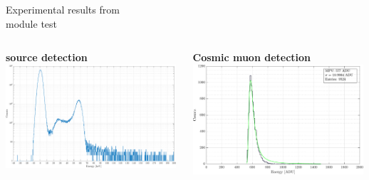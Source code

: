 \documentclass[aspectratio=169,xcolor=dvipsnames]{beamer}
\begin{document}
\begin{frame}{Experimental results from\\ \vskip-0.15cm module test}
\begin{columns}
            \fontsize{7pt}{1}\selectfont
            \centering
            \textbf{ source detection} \\
            \vspace{0.1cm}
            \includegraphics[width=0.99\textwidth]{images/muon_detection/ch4_americio_log.pdf}
            
            \vskip0.15cm
            \textbf{Cosmic muon detection} \\
            \vspace{0.1cm}
            \includegraphics[width=0.99\textwidth]{images/muon_detection/incoming_energy_thr130_ZS_landau.pdf}
    \end{columns}
\end{frame}
\end{document}
